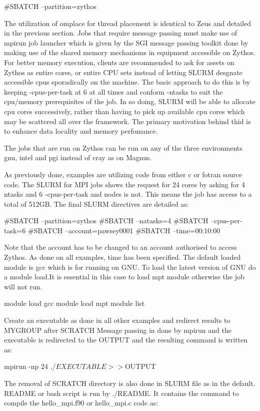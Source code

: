 \begin{Document}
#SBATCH --partition=zythos

The utilization of omplace for thread placement is identical to Zeus and detailed in the previous section.
Jobs that require message passing must make use of mpirun job launcher which is given by the SGI message passing toolkit done by making use of the shared memory mechanisms in equipment accessible on Zythos.
For better memory execution, clients are recommended to ask for assets on Zythos as entire cores, or entire CPU sets instead of letting SLURM desgnate accessible cpus sporadically on the machine. 
The basic approach to do this is by keeping -cpus-per-task at 6 at all times and conform -ntasks to suit the cpu/memory prerequisites of the job.
In so doing, SLURM will be able to allocate cpu cores successively, rather than having to pick up available cpu cores which may be scattered all over the framework.
The primary motivation behind thid is to enhance data locality and memory perfomance.

The jobs that are run on Zythos can be run on any of the three environments gnu, intel and pgi instead of cray as on Magnus.




As previously done, examples are utilizing code from either c or fotran source code.
The SLURM for MPI jobs shows the request for 24 cores by asking for 4 ntasks and 6 -cpus-per-task and nodes is not. 
This means the job has access to a total of 512GB.
The final SLURM directives are detailed as:

#SBATCH --partition=zythos
#SBATCH --natasks=4
#SBATCH --cpus-per-task=6
#SBATCH --account=pawsey0001
#SBATCH --time=00:10:00

Note that the account has to be changed to an account authorised to access Zythos.
As done on all examples, time has been specified.
The default loaded module is gcc which is for running on GNU.
To load the latest version of GNU do a module load.It is essential in this case to load mpt module otherwise the job will not run.

module load gcc
module load mpt
module list

Create an executable as done in all other examples and redirect results to MYGROUP after SCRATCH
Message passing in done by mpirun and the executable is redirected to the OUTPUT and the resulting command is written as:

mpirun -np 24 ./$EXECUTABLE >> ${OUTPUT}

The removal of SCRATCH directory is also done in SLURM file as in the default.
README or bash script is run by ./README.
It contains the command to compile the hello_mpi.f90 or hello_mpi.c code as:


\end{Document}
